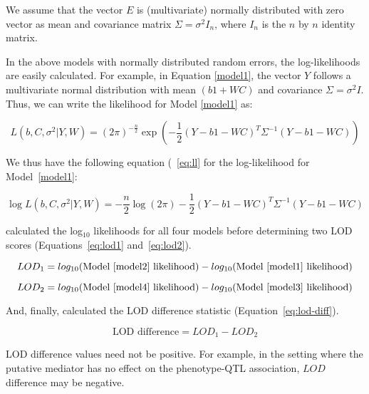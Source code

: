 \documentclass[oneside]{book}\usepackage[]{graphicx}\usepackage[]{color}
\begin{document}
\begin{titlepage}
We assume that the vector $E$ is (multivariate) normally
distributed with zero vector as mean and covariance matrix
$\Sigma = \sigma^2I_n$, where $I_n$ is the $n$ by $n$
identity matrix.

In the above models with normally distributed random
errors, the log-likelihoods are easily calculated. For
example, in Equation \ref{model1}, the vector $Y$ follows
a multivariate normal distribution with mean $(b1 + WC)$
and covariance $\Sigma = \sigma^2I$. Thus, we can write
the likelihood for Model \ref{model1} as:

\begin{equation}
    L(b, C, \sigma^2| Y, W) = (2\pi)^{- \frac{n}{2}}\exp{ \left(- \frac{1}{2}(Y - b1 - WC)^T\Sigma^{-1}(Y - b1 - WC)\right)}
\end{equation}

We thus have the following equation (~\ref{eq:ll} for the
log-likelihood for Model~\ref{model1}:

\begin{equation}
    \log L(b, C, \sigma^2 | Y, W) = - \frac{n}{2}\log (2\pi) - \frac{1}{2} (Y - b1 - WC)^T\Sigma^{-1}(Y - b1 - WC)\label{eq:ll}
\end{equation}


\citet{chick2016defining} calculated the log$_{10}$
likelihoods for all four models before determining two LOD
scores (Equations~\ref{eq:lod1} and~\ref{eq:lod2}).


\begin{equation}
LOD_1 = log_{10}(\text{Model~\ref{model2} likelihood}) - log_{10}(\text{Model~\ref{model1} likelihood})\label{eq:lod1}
\end{equation}

\begin{equation}
LOD_2 = log_{10}(\text{Model~\ref{model4} likelihood}) - log_{10}(\text{Model~\ref{model3} likelihood})\label{eq:lod2}
\end{equation}

And, finally, \citet{chick2016defining} calculated the LOD
difference statistic (Equation~\ref{eq:lod-diff}).

\begin{equation}
\text{LOD difference} = LOD_1 - LOD_2\label{eq:lod-diff}
\end{equation}

LOD difference values need not be positive.
For example, in the setting where the putative mediator has no effect on the phenotype-QTL association, $LOD$ difference may be negative.


\end{titlepage}
\end{document}
